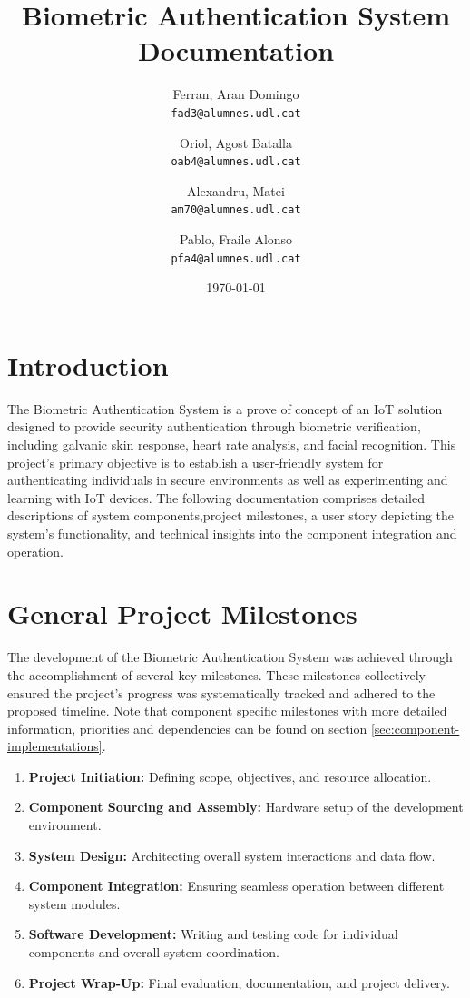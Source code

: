 \documentclass{article}
\title{Biometric Authentication System Documentation}
\author{
  Ferran, Aran Domingo\\
  \texttt{fad3@alumnes.udl.cat}
  \and
  Oriol, Agost Batalla\\
  \texttt{oab4@alumnes.udl.cat}
  \and
  Alexandru, Matei\\
  \texttt{am70@alumnes.udl.cat}
  \and
  Pablo, Fraile Alonso\\
  \texttt{pfa4@alumnes.udl.cat}
}
\date{\today}
\begin{document}
\maketitle
\newpage
\tableofcontents
\listoffigures
\newpage

\section{Introduction}
The Biometric Authentication System is a prove of concept of an IoT
solution designed to provide security authentication through biometric verification, including
galvanic skin response, heart rate analysis, and facial recognition. This
project's primary objective is to establish a user-friendly system
for authenticating individuals in secure environments as well as experimenting and learning with IoT devices. The following
documentation comprises detailed descriptions of system components,project milestones, a user story depicting the system's functionality, and
technical insights into the component integration and operation.

\section{General Project Milestones} The development of the Biometric
Authentication System was achieved through the accomplishment of several key
milestones. These milestones collectively ensured the project's progress was
systematically tracked and adhered to the proposed timeline. Note that component specific milestones with more
detailed information, priorities and dependencies can be found on section \ref{sec:component-implementations}.

\begin{enumerate} 
    \item \textbf{Project Initiation:} Defining scope, objectives,
and resource allocation. 
\item \textbf{Component Sourcing and Assembly:} Hardware setup of the development environment. 
\item \textbf{System Design:} Architecting overall system interactions and data flow.
\item \textbf{Component Integration:} Ensuring seamless operation between
different system modules. 
\item \textbf{Software Development:} Writing and
testing code for individual components and overall system coordination. 
\item \textbf{Project Wrap-Up:} Final evaluation, documentation,
and project delivery. 
\end{enumerate}
\end{document}
